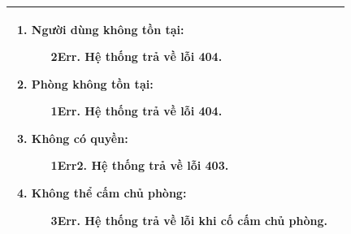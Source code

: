 {\begin{tabularx}{\textwidth}{|>{\raggedright\arraybackslash}p{3.5cm}|>{\raggedright\arraybackslash}X|}
\begin{enumerate}
    \item \textbf{Người dùng không tồn tại:}
    \begin{enumerate}
        \item[2Err.] Hệ thống trả về lỗi 404.
    \end{enumerate}
    \item \textbf{Phòng không tồn tại:}
    \begin{enumerate}
        \item[1Err.] Hệ thống trả về lỗi 404.
    \end{enumerate}
    \item \textbf{Không có quyền:}
    \begin{enumerate}
        \item[1Err2.] Hệ thống trả về lỗi 403.
    \end{enumerate}
    \item \textbf{Không thể cấm chủ phòng:}
    \begin{enumerate}
        \item[3Err.] Hệ thống trả về lỗi khi cố cấm chủ phòng.
    \end{enumerate}
\end{enumerate} \\
\hline
\end{tabularx}
}
